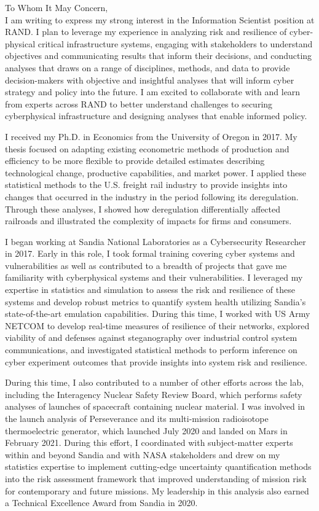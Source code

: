 \documentclass[10pt]{article}
\begin{document}
\noindent To Whom It May Concern,\\

I am writing to express my strong interest in the Information Scientist position at RAND. I plan to leverage my experience in analyzing risk and resilience of cyber-physical critical infrastructure systems, engaging with stakeholders to understand objectives and communicating results that inform their decisions, and conducting analyses that draws on a range of disciplines, methods, and data to provide decision-makers with objective and insightful analyses that will inform cyber strategy and policy into the future. I am excited to collaborate with and learn from experts across RAND to better understand challenges to securing cyberphysical infrastructure and designing analyses that enable informed policy.

I received my Ph.D. in Economics from the University of Oregon in 2017. My thesis focused on adapting existing econometric methods of production and efficiency to be more flexible to provide detailed estimates describing technological change, productive capabilities, and market power. I applied these statistical methods to the U.S. freight rail industry to provide insights into changes that occurred in the industry in the period following its deregulation. Through these analyses, I showed how deregulation differentially affected railroads and illustrated the complexity of impacts for firms and consumers. 

I began working at Sandia National Laboratories as a Cybersecurity Researcher in 2017. Early in this role, I took formal training covering cyber systems and vulnerabilities as well as contributed to a breadth of projects that gave me familiarity with cyberphysical systems and their vulnerabilities. I leveraged my expertise in statistics and simulation to assess the risk and resilience of these systems and develop robust metrics to quantify system health utilizing Sandia's state-of-the-art emulation capabilities. During this time, I worked with US Army NETCOM to develop real-time measures of resilience of their networks, explored viability of and defenses against steganography over industrial control system communications, and investigated statistical methods to perform inference on cyber experiment outcomes that provide insights into system risk and resilience.

During this time, I also contributed to a number of other efforts across the lab, including the Interagency Nuclear Safety Review Board, which performs safety analyses of launches of spacecraft containing nuclear material. I was involved in the launch analysis of Perseverance and its multi-mission radioisotope thermoelectric generator, which launched July 2020 and landed on Mars in February 2021. During this effort, I coordinated with subject-matter experts within and beyond Sandia and with NASA stakeholders and drew on my statistics expertise to implement cutting-edge uncertainty quantification methods into the risk assessment framework that improved understanding of mission risk for contemporary and future missions. My leadership in this analysis also earned a Technical Excellence Award from Sandia in 2020.
\end{document}
